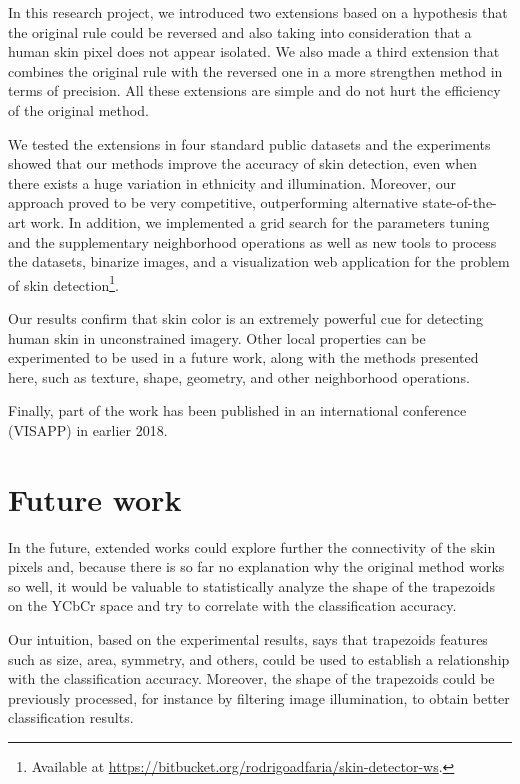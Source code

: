 In this research project, we introduced two extensions based on a hypothesis that the original rule could be reversed and also taking into consideration that a human skin pixel does not appear isolated. We also made a third extension that combines the original rule with the reversed one in a more strengthen method in terms of precision. All these extensions are simple and do not hurt the efficiency of the original method.

We tested the extensions in four standard public datasets and the experiments showed that our methods improve the accuracy of skin detection, even when there exists a huge variation in ethnicity and illumination. Moreover, our approach proved to be very competitive, outperforming alternative state-of-the-art work. In addition, we implemented a grid search for the parameters tuning and the supplementary neighborhood operations as well as new tools to process the datasets, binarize images, and a visualization web application for the problem of skin detection\footnote{Available at \url{https://bitbucket.org/rodrigoadfaria/skin-detector-ws}.}.

Our results confirm that skin color is an extremely powerful cue for detecting human skin in unconstrained imagery. Other local properties can be experimented to be used in a future work, along with the methods presented here, such as texture, shape, geometry, and other neighborhood operations.

Finally, part of the work has been published in an international conference  (VISAPP) in earlier 2018.


\section{Future work}
\label{sec:future_work}

In the future, extended works could explore further the connectivity of the skin pixels and, because there is so far no explanation why the original method works so well, it would be valuable to statistically analyze the shape of the trapezoids on the YCbCr space and try to correlate with the classification accuracy.

Our intuition, based on the experimental results, says that trapezoids features such as size, area, symmetry, and others, could be used to establish a relationship with the classification accuracy. Moreover, the shape of the trapezoids could be previously processed, for instance by filtering image illumination, to obtain better classification results.

